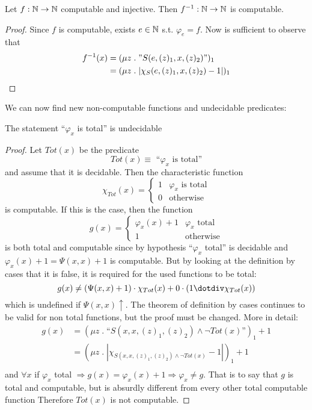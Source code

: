 \begin{theorem}
  Let $f: \mathbb{N} \rightarrow \mathbb{N}$ computable and injective. Then
  $f^{-1}: \mathbb{N} \rightarrow \mathbb{N}$ is computable.
  \begin{proof}
    Since $f$ is computable, exists $e \in \mathbb{N}$ s.t. $\varphi_e =
    f$. Now is sufficient to observe that
    \[
      \begin{split}
        f^{-1}(x) &= (\mu z \; . \;  "S(e, (z)_1, x, (z)_2)")_1 \\
        &= (\mu z \; . \; |\chi_S(e, (z)_1, x, (z)_2) - 1|)_1
      \end{split}
    \]
  \end{proof}
\end{theorem}

We can now find new non-computable functions and undecidable predicates:

\begin{theorem}
  The statement ``$\varphi_x$ is total'' is undecidable
  \begin{proof}
    Let $Tot(x)$ be the predicate
    \[ Tot(x) \equiv \mbox{ ``$\varphi_x$ is total''} \] and assume
    that it is decidable. Then the characteristic function
    \[
      \chi_{Tot}(x) = \begin{cases}
        1 & \varphi_x \mbox{ is total} \\
        0 & \mbox{otherwise}
      \end{cases}
    \]
    is computable. If this is the case, then the function
    \[
      g(x) = \begin{cases}
        \varphi_x (x) + 1 & \varphi_x \mbox{ total}\\
        1 & \mbox{otherwise}
      \end{cases}
    \]
    is both total and computable since by hypothesis ``$\varphi_x$
    total'' is decidable and $\varphi_x(x) + 1 = \Psi(x,x) + 1$ is
    computable. But by looking at the definition by cases that it is
    false, it is required for the used functions to be total:
    \[ g(x) \neq (\Psi(x,x) + 1) \cdot \chi_{Tot}(x) + 0 \cdot (1
      \dotdiv \chi_{Tot}(x))\] which is undefined if
    $\Psi(x,x) \uparrow$. The theorem of definition by cases continues
    to be valid for non total functions, but the proof must be
    changed. More in detail:
    \[
      \begin{split}
        g(x) &= (\mu z \;.\; \mbox{``}S(x,x,(z)_1, (z)_2) \wedge \lnot Tot(x)\mbox{''})_1 + 1 \\
        &= (\mu z \;.\; | \chi_{S(x,x,(z)_1, (z)_2) \wedge \lnot Tot(x)} -  1|)_1 + 1 \\
      \end{split}
    \]
    and $\forall x$ if $\varphi_x$ total
    $\Rightarrow g(x) = \varphi_x(x) + 1 \Rightarrow \varphi_x \neq
    g$. That is to say that $g$ is total and computable, but is
    absurdly different from every other total computable function
    Therefore $Tot(x)$ is not computable.
  \end{proof}
\end{theorem}

